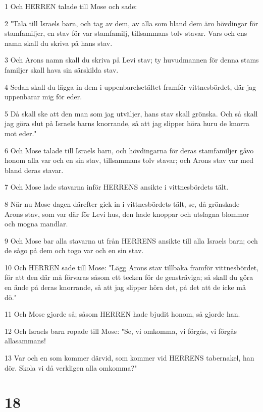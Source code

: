 \par 1 Och HERREN talade till Mose och sade:
\par 2 "Tala till Israels barn, och tag av dem, av alla som bland dem äro hövdingar för stamfamiljer, en stav för var stamfamilj, tillsammans tolv stavar. Vars och ens namn skall du skriva på hans stav.
\par 3 Och Arons namn skall du skriva på Levi stav; ty huvudmannen för denna stams familjer skall hava sin särskilda stav.
\par 4 Sedan skall du lägga in dem i uppenbarelsetältet framför vittnesbördet, där jag uppenbarar mig för eder.
\par 5 Då skall ske att den man som jag utväljer, hans stav skall grönska. Och så skall jag göra slut på Israels barns knorrande, så att jag slipper höra huru de knorra mot eder."
\par 6 Och Mose talade till Israels barn, och hövdingarna för deras stamfamiljer gåvo honom alla var och en sin stav, tillsammans tolv stavar; och Arons stav var med bland deras stavar.
\par 7 Och Mose lade stavarna inför HERRENS ansikte i vittnesbördets tält.
\par 8 När nu Mose dagen därefter gick in i vittnesbördets tält, se, då grönskade Arons stav, som var där för Levi hus, den hade knoppar och utslagna blommor och mogna mandlar.
\par 9 Och Mose bar alla stavarna ut från HERRENS ansikte till alla Israels barn; och de sågo på dem och togo var och en sin stav.
\par 10 Och HERREN sade till Mose: "Lägg Arons stav tillbaka framför vittnesbördet, för att den där må förvaras såsom ett tecken för de gensträviga; så skall du göra en ände på deras knorrande, så att jag slipper höra det, på det att de icke må dö."
\par 11 Och Mose gjorde så; såsom HERREN hade bjudit honom, så gjorde han.
\par 12 Och Israels barn ropade till Mose: "Se, vi omkomma, vi förgås, vi förgås allasammans!
\par 13 Var och en som kommer därvid, som kommer vid HERRENS tabernakel, han dör. Skola vi då verkligen alla omkomma?"

\chapter{18}

